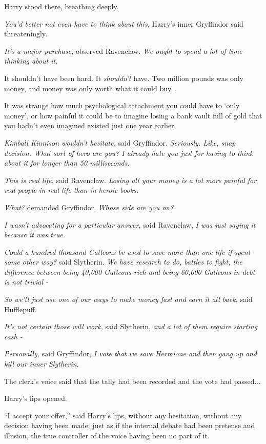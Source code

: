 Harry stood there, breathing deeply.

\emph{You'd better not even have to think about this,} Harry's inner
Gryffindor said threateningly.

\emph{It's a major purchase,} observed Ravenclaw. \emph{We ought to
spend a lot of time thinking about it.}

It shouldn't have been hard. It \emph{shouldn't} have. Two million
pounds was only money, and money was only worth what it could
buy...

It was strange how much psychological attachment you could have to `only
money', or how painful it could be to imagine losing a bank vault full
of gold that you hadn't even imagined existed just one year earlier.

\emph{Kimball Kinnison wouldn't hesitate,} said Gryffindor.
\emph{Seriously. Like, snap decision. What sort of hero are you? I
already hate you just for having to think about it for longer than 50
milliseconds.}

\emph{This is real life,} said Ravenclaw. \emph{Losing all your money is
a lot more painful for real people in real life than in heroic books.}

\emph{What?} demanded Gryffindor. \emph{Whose side are you on?}

\emph{I wasn't advocating for a particular answer,} said Ravenclaw,
\emph{I was just saying it because it was true.}

\emph{Could a hundred thousand Galleons be used to save more than one
life if spent some other way?} said Slytherin. \emph{We have research to
do, battles to fight, the difference between being 40,000 Galleons rich
and being 60,000 Galleons in debt is not trivial -}

\emph{So we'll just use one of our ways to make money fast and earn it
all back,} said Hufflepuff.

\emph{It's not certain those will work,} said Slytherin, \emph{and a lot
of them require starting cash -}

\emph{Personally,} said Gryffindor, \emph{I vote that we save Hermione
and then gang up and kill our inner Slytherin.}

The clerk's voice said that the tally had been recorded and the vote had
passed...

Harry's lips opened.

``I accept your offer,'' said Harry's lips, without any hesitation,
without any decision having been made; just as if the internal debate
had been pretense and illusion, the true controller of the voice having
been no part of it.

